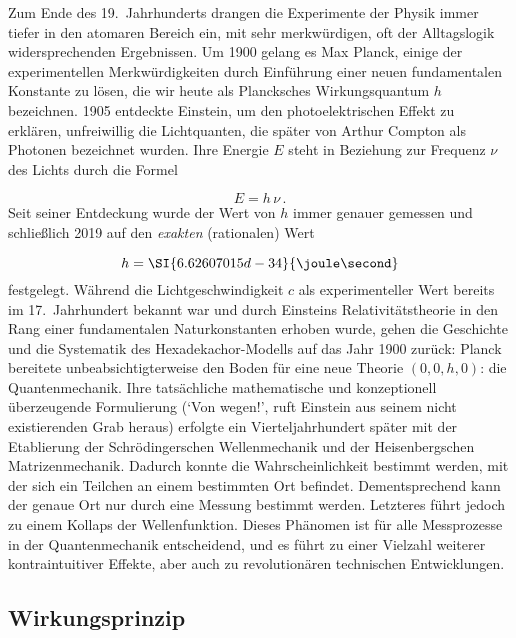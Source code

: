
\newpage {}
\label{sec:0010}

Zum Ende des 19.\ Jahrhunderts drangen die Experimente der Physik immer tiefer in den atomaren Bereich ein, mit sehr merkwürdigen, oft der Alltagslogik widersprechenden Ergebnissen. Um 1900 gelang es Max Planck, einige der experimentellen Merkwürdigkeiten durch Einführung einer neuen fundamentalen Konstante zu lösen, die wir heute als Plancksches Wirkungsquantum $h$ bezeichnen. 1905 entdeckte Einstein, um den photoelektrischen Effekt zu erklären, unfreiwillig die Lichtquanten, die später von Arthur Compton als Photonen bezeichnet wurden. Ihre Energie $E$ steht in Beziehung zur Frequenz $\nu$ des Lichts durch die Formel

\begin{equation*}
  E=h\,\nu\,.
\end{equation*}
%
Seit seiner Entdeckung wurde der Wert von $h$ immer genauer gemessen und schließlich 2019 auf den \emph{exakten} (rationalen) Wert  

\begin{equation*}
  h=\SI{6.62607015d-34}{\joule\second}
\end{equation*}
%
festgelegt. Während die Lichtgeschwindigkeit $c$ als experimenteller Wert bereits im 17.\ Jahrhundert bekannt war und durch Einsteins Relativitätstheorie in den Rang einer fundamentalen Naturkonstanten erhoben wurde, gehen die Geschichte und die Systematik des Hexadekachor-Modells auf das Jahr 1900 zurück: Planck bereitete unbeabsichtigterweise den Boden für eine neue Theorie $(0,0,h,0)$: die Quantenmechanik. Ihre tatsächliche mathematische und konzeptionell überzeugende Formulierung (\enquote*{Von wegen!}, ruft Einstein aus seinem nicht existierenden Grab heraus) erfolgte ein Vierteljahrhundert später mit der Etablierung der Schrödingerschen Wellenmechanik und der Heisenbergschen Matrizenmechanik. Dadurch konnte die Wahrscheinlichkeit bestimmt werden, mit der sich ein Teilchen an einem bestimmten Ort befindet. Dementsprechend kann der genaue Ort nur durch eine Messung bestimmt werden. Letzteres führt jedoch zu einem Kollaps der Wellenfunktion. Dieses Phänomen ist für alle Messprozesse in der Quantenmechanik entscheidend, und es führt zu einer Vielzahl weiterer kontraintuitiver Effekte, aber auch zu revolutionären technischen Entwicklungen.


\subsection*{Wirkungsprinzip}

